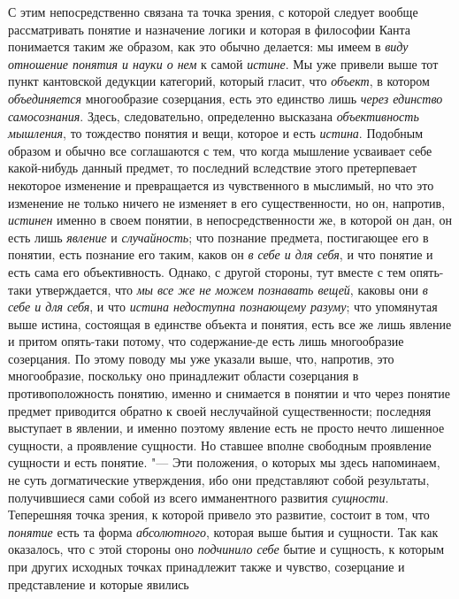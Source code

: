 С этим непосредственно связана та точка зрения, с которой
следует вообще рассматривать понятие и назначение логики и которая в
философии Канта понимается таким же образом, как это обычно делается: мы
имеем в {\em виду отношение понятия и
науки о нем} к самой
{\em истине}. Мы уже
привели выше тот пункт кантовской дедукции категорий, который гласит, что
{\em объект}, в котором
{\em объединяется}
многообразие созерцания, есть это единство лишь
{\em через единство самосознания}.
Здесь, следовательно, определенно высказана
{\em объективность мышления},
то тождество понятия и вещи, которое и есть
{\em истина}. Подобным
образом и обычно все соглашаются с тем, что когда мышление усваивает себе
какой-нибудь данный предмет, то последний вследствие этого претерпевает
некоторое изменение и превращается из чувственного в мыслимый, но что это
изменение не только ничего не изменяет в его существенности, но он,
напротив, {\em истинен}
именно в своем понятии, в непосредственности же, в которой он
дан, он есть лишь {\em явление}
и {\em случайность};
что познание предмета, постигающее его в понятии, есть
познание его таким, каков он {\em в себе
и для себя}, и что понятие и есть сама его объективность.
Однако, с другой стороны, тут вместе с тем опять-таки
утверждается,
что {\em мы все же не
можем познавать вещей}, каковы они
{\em в себе и для себя},
и что {\em истина
недоступна познающему разуму}; что упомянутая выше
истина, состоящая в единстве объекта и понятия, есть все же
лишь явление и притом опять-таки потому, что содержание-де есть лишь
многообразие созерцания. По этому поводу мы уже указали выше, что,
напротив, это многообразие, поскольку оно принадлежит области созерцания в
противоположность понятию, именно и снимается в понятии и что через понятие
предмет приводится обратно к своей неслучайной существенности; последняя
выступает в явлении, и именно поэтому явление есть не просто нечто лишенное
сущности, а проявление сущности. Но ставшее вполне свободным проявление
сущности и есть понятие. "--- Эти положения, о которых мы здесь
напоминаем, не суть догматические утверждения, ибо они представляют собой
результаты, получившиеся сами собой из всего имманентного развития
{\em сущности}.
Теперешняя точка зрения, к которой привело это развитие,
состоит в том, что {\em понятие}
есть та форма
{\em абсолютного},
которая выше бытия и сущности. Так как оказалось, что с этой
стороны оно {\em подчинило себе}
бытие и сущность, к которым при других исходных точках
принадлежит также и чувство, созерцание и представление и которые явились
